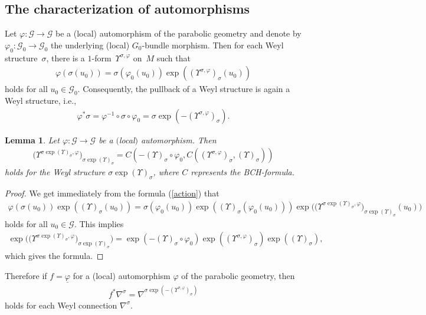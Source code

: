 \documentclass[pdftex]{sigma}
\newcommand{\si}{\sigma}
\newcommand{\un}{\underline}
\newcommand{\ba}{\mathcal{G}}
\newcommand{\va}{\varphi}
\newcommand{\U}{\Upsilon}
\numberwithin{equation}{section}
\newtheorem{Lemma}[Theorem]{Lemma}
\begin{document}
\subsection{The characterization of automorphisms}\label{sec2.2}
Let $\va\colon \ba \to \ba$ be a (local) automorphism of the parabolic geometry and denote by $\va_0:\ba_0 \to \ba_0$ the underlying (local) $G_0$-bundle morphism. Then for each Weyl structure~$\si$, there is a $1$-form~$\U^{\si,\va}$ on~$M$ such that
\begin{gather} \label{action}
\va(\si(u_0))=\si(\va_0(u_0))\exp((\U^{\si,\va})_\si(u_0))
\end{gather}
holds for all $u_0\in \ba_0$. Consequently, the pullback of a Weyl structure is again a Weyl structure, i.e., \begin{gather*}\va^*\si=\va^{-1} \circ \si \circ \va_0=\si \exp(-(\U^{\si,\va})_\si).\end{gather*}

\begin{Lemma} \label{lem3}
Let $\va\colon \ba \to \ba$ be a $($local$)$ automorphism. Then
\begin{gather} \label{2.4.}
\big(\U^{\si\exp (\U)_\si,\va}\big)_{\si\exp (\U)_\si}=C(-(\U)_\si\circ\va_0,C((\U^{\si,\va})_\si,(\U)_\si))
\end{gather}
holds for the Weyl structure $\si\exp (\U)_\si$, where $C$ represents the BCH-formula.
\end{Lemma}
\begin{proof}
We get immediately from the formula (\ref{action}) that
 \begin{gather*} \va(\si(u_0))\exp((\U)_\si(u_0))=\si(\va_0(u_0))\exp((\U)_\si(\va_0(u_0)))\exp\big(\big(\U^{\si\exp (\U)_\si,\va}\big)_{\si\exp (\U)_\si}(u_0)\big)
\end{gather*} holds for all $u_0\in \ba$. This implies \begin{gather*}\exp\big(\big(\U^{\si\exp (\U)_\si,\va}\big)_{\si\exp (\U)_\si}\big)=\exp(-(\U)_\si\circ \va_0)\exp((\U^{\si,\va})_\si)\exp((\U)_\si),\end{gather*} which gives the formula.
\end{proof}

Therefore if $f=\un{\va}$ for a (local) automorphism $\va$ of the parabolic geometry, then
\begin{gather*}f^*\nabla^\si=\nabla^{\si \exp(-(\U^{\si,\va})_\si)}\end{gather*}
holds for each Weyl connection $\nabla^\si$.
\end{document}
